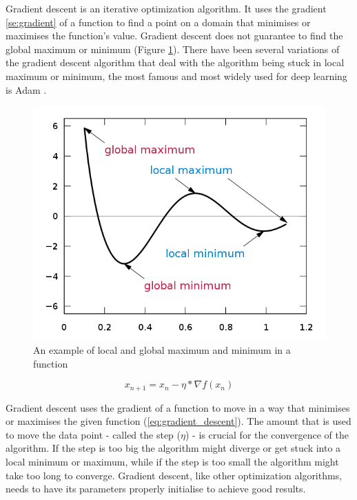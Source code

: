 \documentclass[times, utf8, diplomski]{fer}
\begin{document}
Gradient descent is an iterative optimization algorithm. It uses the gradient \ref{se:gradient} of a function to find a point on a domain that minimises or maximises the function's value. Gradient descent does not guarantee to find the global maximum or minimum (Figure \ref{fig:local_and_global_function_values}). There have been several variations of the gradient descent algorithm that deal with the algorithm being stuck in local maximum or minimum, the most famous and most widely used for deep learning is Adam \citep{kingma_adam:_2014}.

\begin{figure}
  \includegraphics[scale=0.5]{figures/local_global_maxima_minima.png}
  \centering
  \caption{An example of local and global maximum and minimum in a function}
  \label{fig:local_and_global_function_values}
\end{figure}

\begin{equation} 
\label{eq:gradient_descent}
    x_{n+1} = x_n - \eta * \nabla{f(x_n)}
\end{equation}

Gradient descent uses the gradient of a function to move in a way that minimises or maximises the given function (\ref{eq:gradient_descent}). The amount that is used to move the data point - called the step ($\eta$) - is crucial for the convergence of the algorithm. If the step is too big the algorithm might diverge or get stuck into a local minimum or maximum, while if the step is too small the algorithm might take too long to converge. Gradient descent, like other optimization algorithms, needs to have its parameters properly initialise to achieve good results.
\end{document}
